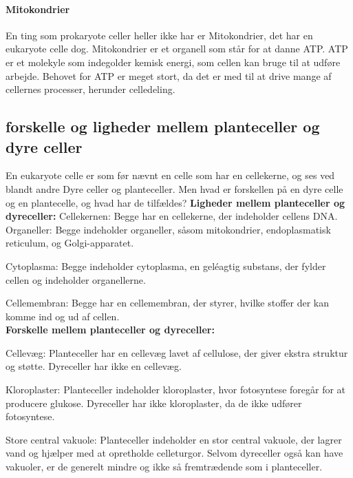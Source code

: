             \paragraph{Mitokondrier}
                En ting som prokaryote celler heller ikke har er Mitokondrier, det har en eukaryote celle dog. Mitokondrier er et organell som står for at danne ATP.
                ATP er et molekyle som indegolder kemisk energi, som cellen kan bruge til at udføre arbejde. Behovet for ATP er meget stort, da det er med til at drive mange af cellernes processer, herunder celledeling.   
            
        \subsection{forskelle og ligheder mellem planteceller og dyre celler}
            En eukaryote celle er som før nævnt en celle som har en cellekerne, og ses ved blandt andre Dyre celler og planteceller. Men hvad er forskellen på en dyre celle og en plantecelle, og hvad har de tilfældes?
            \newline\textbf{Ligheder mellem planteceller og dyreceller:}\newline
            Cellekernen: Begge har en cellekerne, der indeholder cellens DNA.
            Organeller: Begge indeholder organeller, såsom mitokondrier, endoplasmatisk reticulum, og Golgi-apparatet.

            Cytoplasma: Begge indeholder cytoplasma, en geléagtig substans, der fylder cellen og indeholder organellerne.

            Cellemembran: Begge har en cellemembran, der styrer, hvilke stoffer der kan komme ind og ud af cellen. \\
            \textbf{Forskelle mellem planteceller og dyreceller:}\newline

            Cellevæg: Planteceller har en cellevæg lavet af cellulose, der giver ekstra struktur og støtte. Dyreceller har ikke en cellevæg.

            Kloroplaster: Planteceller indeholder kloroplaster, hvor fotosyntese foregår for at producere glukose. Dyreceller har ikke kloroplaster, da de ikke udfører fotosyntese.

            Store central vakuole: Planteceller indeholder en stor central vakuole, der lagrer vand og hjælper med at opretholde celleturgor. Selvom dyreceller også kan have vakuoler, er de generelt mindre og ikke så fremtrædende som i planteceller.

